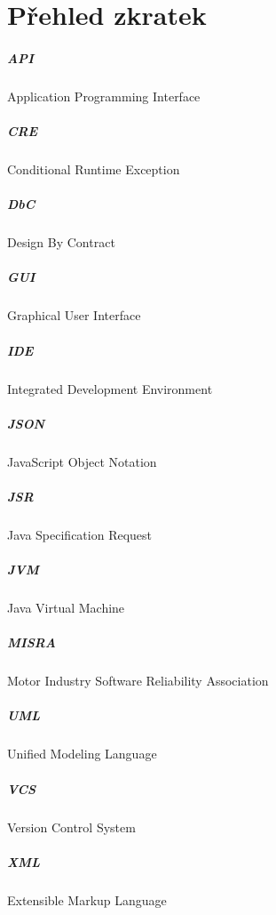 \chapter*{Přehled zkratek}

\paragraph{API}
	Application Programming Interface
	
\paragraph{CRE}
	Conditional Runtime Exception

\paragraph{DbC}
	Design By Contract

\paragraph{GUI}	
	Graphical User Interface

\paragraph{IDE}
	Integrated Development Environment
		
\paragraph{JSON}
	JavaScript Object Notation

\paragraph{JSR}
	Java Specification Request
	
\paragraph{JVM}
	Java Virtual Machine
	
\paragraph{MISRA}
	Motor Industry Software Reliability Association
	
\paragraph{UML}
	Unified Modeling Language
	
\paragraph{VCS}
	Version Control System
		
\paragraph{XML}
	Extensible Markup Language
